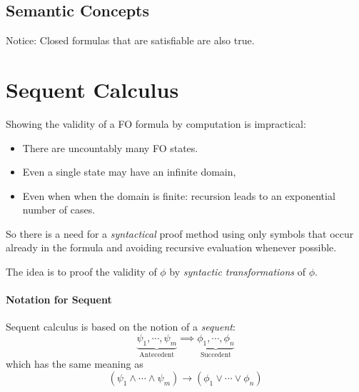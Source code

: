 	\subsection{Semantic Concepts}

		Notice: Closed formulas that are satisfiable are also true.

\section{Sequent Calculus} %
	Showing the validity of a FO formula by computation is impractical:
	\begin{itemize}
		\item There are uncountably many FO states.
		\item Even a single state may have an infinite domain,
		\item Even when when the domain is finite: recursion leads to an exponential number of cases.
	\end{itemize}
	So there is a need for a \textit{syntactical} proof method using only symbols that occur already in the formula and avoiding recursive evaluation whenever possible.

	The idea is to proof the validity of \(\phi\) by \textit{syntactic transformations} of \(\phi\).

	\paragraph{Notation for Sequent}
		Sequent calculus is based on the notion of a \textit{sequent}:
		\begin{equation*}
			\underbrace{\psi_1, \cdots, \psi_m}_\textrm{Antecedent} \implies \underbrace{\phi_1, \cdots, \phi_n}_\textrm{Succedent}
		\end{equation*}
		which has the same meaning as
		\begin{equation*}
			(\psi_1 \land \cdots \land \psi_m) \to (\phi_1 \lor \cdots \lor \phi_n)
		\end{equation*}


